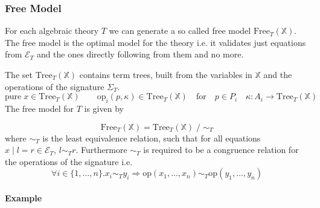 % 

\subsubsection{Free Model}

For each algebraic theory $T$ we can generate a so called free model
$\mathrm{Free}_T(\mathbb{X})$.
The free model is the optimal model for the theory i.e. it validates just
equations from $\mathcal{E}_T$ and the ones directly following from them and no
more.

The set $\mathrm{Tree}_T(\mathbb{X})$ contains term trees, built from the
variables in $\mathbb{X}$ and the operations of the signature $\Sigma_T$.
\[
  \mathrm{pure}\;x \in \mathrm{Tree}_T(\mathbb{X}) \qquad \mathrm{op}_i(p,\kappa)
  \in \mathrm{Tree}_T(\mathbb{X}) \quad\text{for}\quad p\in P_i \quad \kappa :
  A_i \rightarrow \mathrm{Tree}_T(\mathbb{X})
\]
The free model for $T$ is given by

\[
  \mathrm{Free}_T(\mathbb{X}) = \mathrm{Tree}_T(\mathbb{X})\; /\;\sim_T
\]
where $\sim_T$ is the least equivalence relation, such that for all equations
$x\;|\;l=r\in\mathcal{E}_T$, $l\sim_T r$.
Furthermore $\sim_T$ is required to be a congruence relation for the operations
of the signature i.e.
\[
  \forall i\in\{1,\dots ,n\}. x_i\sim_T y_i \Rightarrow \mathrm{op}(x_1,\dots , x_n)
  \sim_T \mathrm{op}(y_1,\dots , y_n)
\]

\paragraph{Example}

